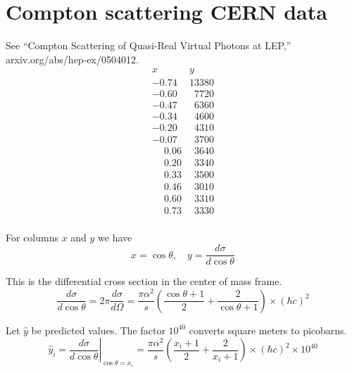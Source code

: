 

\section*{Compton scattering CERN data}

See ``Compton Scattering of Quasi-Real Virtual Photons at LEP,''
arxiv.org/abs/hep-ex/0504012.
\begin{equation*}
\begin{matrix}
x & y\\
-0.74 & 13380\\
-0.60 & \phantom{0}7720\\
-0.47 & \phantom{0}6360\\
-0.34 & \phantom{0}4600\\
-0.20 & \phantom{0}4310\\
-0.07 & \phantom{0}3700\\
\phantom{+}0.06 & \phantom{0}3640\\
\phantom{+}0.20 & \phantom{0}3340\\
\phantom{+}0.33 & \phantom{0}3500\\
\phantom{+}0.46 & \phantom{0}3010\\
\phantom{+}0.60 & \phantom{0}3310\\
\phantom{+}0.73 & \phantom{0}3330\\
\end{matrix}
\end{equation*}

For columns $x$ and $y$ we have
\begin{equation*}
x=\cos\theta,
\quad
y=\frac{d\sigma}{d\cos\theta}
\end{equation*}

This is the differential cross section in the center of mass frame.
\begin{equation*}
\frac{d\sigma}{d\cos\theta}
=2\pi\frac{d\sigma}{d\Omega}
=\frac{\pi\alpha^2}{s}\left(
\frac{\cos\theta+1}{2}+\frac{2}{\cos\theta+1}
\right)\times(\hbar c)^2
\end{equation*}

Let $\hat y$ be predicted values.
The factor $10^{40}$ converts square meters to picobarns.
\begin{equation*}
\hat y_i
=\left.\frac{d\sigma}{d\cos\theta}\right|_{\cos\theta=x_i}
=
\frac{\pi\alpha^2}{s}
\left(
\frac{x_i+1}{2}+
\frac{2}{x_i+1}
\right)
\times(\hbar c)^2
\times10^{40}
\end{equation*}

